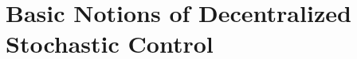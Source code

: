 \documentclass[12pt, oneside]{report}
\newcommand{\1}[1]{\mathbbm{1}_{\{#1\}}}
\theoremstyle{definition}
\begin{document}




\appendix
\chapter{Basic Notions of Decentralized Stochastic Control}
\end{document}
